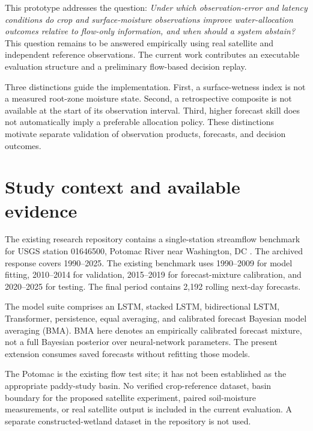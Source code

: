 \documentclass[11pt]{article}
\begin{document}
This prototype addresses the question: \emph{Under which observation-error and latency conditions do crop and surface-moisture observations improve water-allocation outcomes relative to flow-only information, and when should a system abstain?} This question remains to be answered empirically using real satellite and independent reference observations. The current work contributes an executable evaluation structure and a preliminary flow-based decision replay.

Three distinctions guide the implementation. First, a surface-wetness index is not a measured root-zone moisture state. Second, a retrospective composite is not available at the start of its observation interval. Third, higher forecast skill does not automatically imply a preferable allocation policy. These distinctions motivate separate validation of observation products, forecasts, and decision outcomes.

\section{Study context and available evidence}
The existing research repository contains a single-station streamflow benchmark for USGS station 01646500, Potomac River near Washington, DC \cite{usgs}. The archived response covers 1990--2025. The existing benchmark uses 1990--2009 for model fitting, 2010--2014 for validation, 2015--2019 for forecast-mixture calibration, and 2020--2025 for testing. The final period contains 2,192 rolling next-day forecasts.

The model suite comprises an LSTM, stacked LSTM, bidirectional LSTM, Transformer, persistence, equal averaging, and calibrated forecast Bayesian model averaging (BMA). BMA here denotes an empirically calibrated forecast mixture, not a full Bayesian posterior over neural-network parameters. The present extension consumes saved forecasts without refitting those models.

The Potomac is the existing flow test site; it has not been established as the appropriate paddy-study basin. No verified crop-reference dataset, basin boundary for the proposed satellite experiment, paired soil-moisture measurements, or real satellite output is included in the current evaluation. A separate constructed-wetland dataset in the repository is not used.
\end{document}
